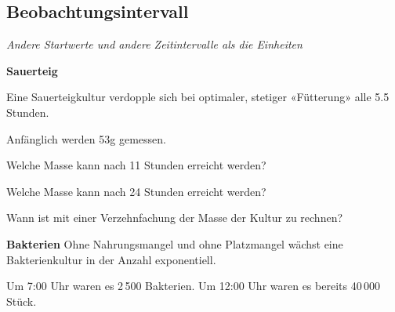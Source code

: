 
\subsection{Beobachtungsintervall}
\textit{Andere Startwerte und andere Zeitintervalle als die Einheiten}



\bbwActAufgabenNr{} \textbf{Sauerteig}

Eine Sauerteigkultur verdopple sich bei optimaler, stetiger «Fütterung» alle 5.5 Stunden.

Anfänglich werden 53g gemessen.

\begin{bbwAufgabenBlock}

\item Welche Masse kann nach 11 Stunden erreicht werden?

\item Welche Masse kann nach 24 Stunden erreicht werden?

\item Wann ist mit einer Verzehnfachung der Masse der Kultur zu rechnen?


\end{bbwAufgabenBlock}
\platzFuerBerechnungenBisEndeSeite{}





\bbwActAufgabenNr{} \textbf{Bakterien}
 Ohne Nahrungsmangel und ohne Platzmangel wächst eine Bakterienkultur
 in der Anzahl exponentiell.

Um 7:00 Uhr waren es 2\,500 Bakterien.
Um 12:00 Uhr waren es bereits 40\,000 Stück.

